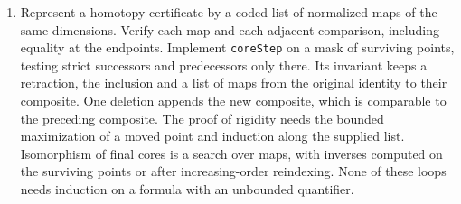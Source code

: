 \begin{enumerate}
all pairs. At stage $k$ verify the join reconstruction equation for all
$a$ whose lower mask has cardinality at most $k$. For the reconstruction
of a lattice homomorphism use the bounded intersection of qualifying opens
and extract the least principal open equal to this intersection.
\item Represent a homotopy certificate by a coded list of normalized
maps of the same dimensions. Verify each map and each adjacent comparison,
including equality at the endpoints. Implement \texttt{coreStep} on a mask
of surviving points, testing strict successors and predecessors only there.
Its invariant keeps a retraction, the inclusion and a list of maps from
the original identity to their composite. One deletion appends the new
composite, which is comparable to the preceding composite. The proof of
rigidity needs the bounded maximization of a moved point and induction
along the supplied list. Isomorphism of final cores is a search over maps,
with inverses computed on the surviving points or after increasing-order
reindexing. None of these loops needs induction on a formula with an
unbounded quantifier.
\end{enumerate}
